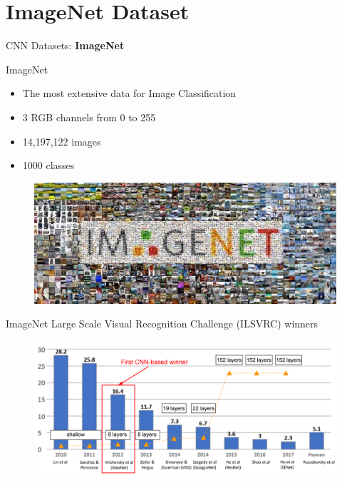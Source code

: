 \section{ImageNet Dataset}
\begin{frame}{}
    \LARGE CNN Datasets: \textbf{ImageNet}
\end{frame}

\begin{frame}{ImageNet}
    \begin{itemize}
        \item The most extensive data for Image Classification
        \item 3 RGB channels from 0 to 255
        \item 14,197,122 images
        \item 1000 classes
    \end{itemize}

    \begin{figure}
        \centering
        \includegraphics[width=1.0\textwidth,height=0.5\textheight,keepaspectratio]{images/cnn/imagenet.png}
    \end{figure}
\end{frame}

\begin{frame}{ImageNet Large Scale Visual Recognition Challenge (ILSVRC) winners}
    \begin{figure}
        \centering
        \includegraphics[width=1.0\textwidth,height=1.0\textheight,keepaspectratio]{images/cnn/imagenet_2.png}
    \end{figure}
\end{frame}